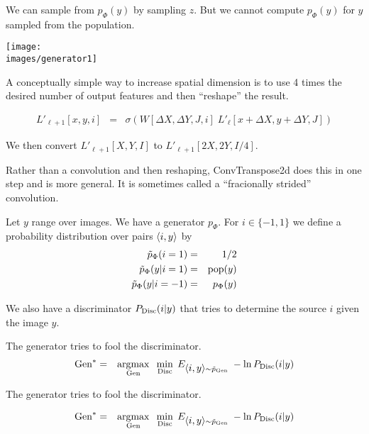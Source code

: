 {\bigskip
We can sample from $p_\Phi(y)$ by sampling $z$.  But we cannot compute $p_\Phi(y)$ for $y$ sampled from the population.


\centerline{\texttt{[image: \\images/generator1]}}

\vfill
A conceptually simple way to increase spatial dimension is to use 4 times the desired number of output features and then ``reshape'' the result.

\begin{eqnarray*}
  L'_{\ell+1}[x,y,i] & = & \sigma\left(W[\Delta X, \Delta Y, J,i]\; L'_\ell[x + \Delta X, y + \Delta Y, J]\right)
\end{eqnarray*}

\vfill
We then convert $L'_{\ell+1}[X,Y,I]$ to $L'_{\ell+1}[2X,2Y,I/4]$.


Rather than a convolution and then reshaping, ConvTranspose2d does this in one step and is more general.  It is sometimes called a ``fracionally strided'' convolution.



Let $y$ range over images.  We have a generator $p_\Phi$. For $i \in \{-1,1\}$ we define a probability distribution over pairs
${\mbox{$\langle i,y\rangle$}}$ by
\begin{eqnarray*}
\tilde{p}_\Phi(i = 1) & = & 1/2 \\
\tilde{p}_\Phi(y|i=1) & =&  \mathrm{pop}(y) \\
\tilde{p}_\Phi(y|i=-1) & = & p_\Phi(y)
\end{eqnarray*}

\vfill
We also have a discriminator $P_{\mathrm{Disc}}(i|y)$ that tries to determine the source $i$ given the image $y$.

\vfill
The generator tries to fool the discriminator.
\begin{eqnarray*}
\mathrm{Gen}^* & = & \operatorname*{argmax}_{\mathrm{Gen}}\;\;\min_{\mathrm{Disc}}\;E_{{\mbox{$\langle i,y\rangle$}} \sim \tilde{p}_{\mathrm{Gen}}}\;-\ln P_{\mathrm{Disc}}(i|y)
\end{eqnarray*}


The generator tries to fool the discriminator.

\vfill
\begin{eqnarray*}
\mathrm{Gen}^* & = & \operatorname*{argmax}_{\mathrm{Gen}}\;\;\min_{\mathrm{Disc}}\;E_{{\mbox{$\langle i,y\rangle$}} \sim \tilde{p}_{\mathrm{Gen}}}\;-\ln P_{\mathrm{Disc}}(i|y)
\end{eqnarray*}

}
